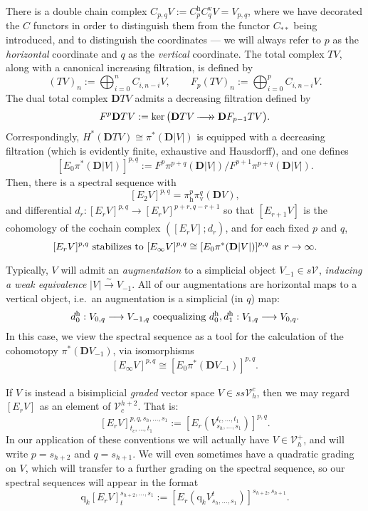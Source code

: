 \documentclass[11pt]{amsart} \renewcommand{\baselinestretch}{1.4}
\theoremstyle{plain}
\theoremstyle{definition}
\renewcommand{\ker}{\mathrm{ker}\,}
\renewcommand{\to}{\longrightarrow}
\newcommand{\calV}{\mathcal{V}}
\newcommand{\vect}[2]{\calV^{#1}_{#2}}
\newcommand{\quadgrad}[1]{\mathrm{q}_{#1}}
\newcommand{\epi}{{\,\makebox[0cm][l]{\ensuremath\to}\to{}}}
\newcommand{\Edown}[4]{[E_{#1}#2]^{#3}_{#4}}
\newcommand{\uver}{^\mathrm{v}}
\newcommand{\uhor}{^\mathrm{h}}
\newcommand{\dver}{_\mathrm{v}}
\newcommand{\dhor}{_\mathrm{h}}
\newcommand{\diag}[1]{|#1|}
\newcommand{\dual}{\mathbf{D}}
\begin{document}
\begin{Conventions and notation}
There is a double chain complex $C_{p,q}V:=C\uhor_p C\uver_q V=V_{p,q}$, where we have decorated the $C$ functors in order to distinguish them from the functor $C_{**}$ being introduced, and to distinguish the coordinates --- we will always refer to $p$ as the \emph{horizontal} coordinate and $q$ as the \emph{vertical} coordinate. The total complex $TV$, along with a canonical increasing filtration, is defined by 
\[(TV)_n:=\bigoplus_{i=0}^{n}C_{i,n-i}V,\qquad F_p(TV)_n:=\bigoplus_{i=0}^{p}C_{i,n-i}V.\]
The dual total complex $\dual TV$ admits a decreasing filtration defined by
\[F^p\dual TV:=\ker\bigl(\dual TV\epi \dual F_{p-1} TV\bigr).\]
Correspondingly, $H^*(\dual TV)\cong \pi^*(\dual\diag{ V})$ is equipped with a decreasing filtration (which is evidently finite, exhaustive and Hausdorff), and one defines
\[\Edown{0}{\pi^*(\dual\diag{ V})}{p,q}{}:=F^{p}\pi^{p+q}(\dual\diag{ V})/F^{p+1}\pi^{p+q}(\dual\diag{ V}).\]
Then, there is a spectral sequence with
\[\Edown{2}{V}{p,q}{}=\pi\dhor^{p}\pi\dver^{q}(\dual V),\]
and differential $d_r:\Edown{r}{V}{p,q}{}\to \Edown{r}{V}{p+r,q-r+1}{}$ so that $\Edown{r+1}{V}{}{}$ is the cohomology of the cochain complex $(\Edown{r}{V}{}{};d_r)$, and for each fixed $p$ and $q$,
\[\Edown{r}{V}{p,q}{}\textup{ stabilizes to }\Edown{\infty}{V}{p,q}{}\cong \Edown{0}{\pi^*(\dual\diag{ V})}{p,q}{}\textup{ as $r\rightarrow\infty$}.\]

Typically, $V$ will admit an \emph{augmentation} to a simplicial object $V_{-1}\in s\vect{}{}$, \emph{inducing a weak equivalence} $\diag{ V}\overset{\sim}{\to}V_{-1}$. All of our  augmentations are horizontal maps to a vertical object, i.e.\ an augmentation is a simplicial (in $q$) map:
\[d\uhor_0:V_{0,q}\to V_{-1,q}\textup{ coequalizing }d\uhor_0,d\uhor_1:V_{1,q}\to V_{0,q}.\]
In this case, we view the spectral sequence as a tool for the calculation of the cohomotopy $\pi^*(\dual V_{-1})$, via isomorphisms
\[\Edown{\infty}{V}{p,q}{}\cong \Edown{0}{\pi^*(\dual V_{-1})}{p,q}{}.\]


If $V$ is instead a bisimplicial \emph{graded} vector space $V\in ss\vect{c}{h}$, then we may regard $\Edown{r}{V}{}{}$ as an element of $\vect{h+2}{c}$. That is:
\[\Edown{r}{V}{p,q,s_h,\ldots,s_1}{t_c,\ldots,t_1}:=\Edown{r}{(V^{t_c,\ldots,t_1}_{s_h,\ldots,s_1})}{p,q}{}.\]
In our application of these conventions we will actually have $V\in \vect{+}{h}$, and will write $p=s_{h+2}$ and $q=s_{h+1}$. We will even sometimes have a quadratic grading on $V$, which will transfer to a further grading on the spectral sequence, so our spectral sequences will appear in the format
\[\quadgrad{k}\Edown{r}{V}{s_{h+2},\ldots,s_1}{t}:=\Edown{r}{(\quadgrad{k}V^{t}_{s_h,\ldots,s_1})}{s_{h+2},s_{h+1}}{}.\]


\end{Conventions and notation}
\end{document}
